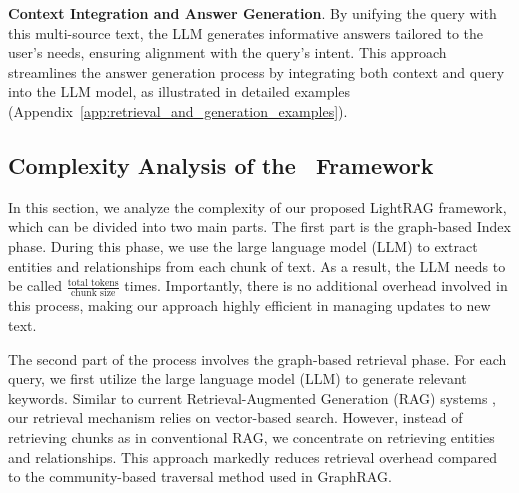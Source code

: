 \textbf{Context Integration and Answer Generation}. By unifying the query with this multi-source text, the LLM generates informative answers tailored to the user's needs, ensuring alignment with the query's intent. This approach streamlines the answer generation process by integrating both context and query into the LLM model, as illustrated in detailed examples (Appendix~\ref{app:retrieval_and_generation_examples}).

\subsection{Complexity Analysis of the \model\ Framework}
In this section, we analyze the complexity of our proposed LightRAG framework, which can be divided into two main parts. The first part is the graph-based Index phase. During this phase, we use the large language model (LLM) to extract entities and relationships from each chunk of text. As a result, the LLM needs to be called \(\frac{\text{total tokens}}{\text{chunk size}}\) times. Importantly, there is no additional overhead involved in this process, making our approach highly efficient in managing updates to new text.

The second part of the process involves the graph-based retrieval phase. For each query, we first utilize the large language model (LLM) to generate relevant keywords. Similar to current Retrieval-Augmented Generation (RAG) systems \cite{gao2023retrieval, hyde, chan2024rq}, our retrieval mechanism relies on vector-based search. However, instead of retrieving chunks as in conventional RAG, we concentrate on retrieving entities and relationships. This approach markedly reduces retrieval overhead compared to the community-based traversal method used in GraphRAG.



